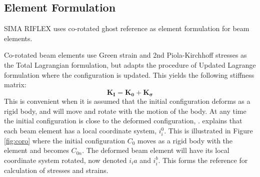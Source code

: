 \subsection{Element Formulation}
\label{sec:ghost}
SIMA RIFLEX uses co-rotated ghost reference as element formulation for beam elements. 

Co-rotated beam elements use Green strain and 2nd
Piola-Kirchhoff stresses as the Total Lagrangian formulation, but adapts the procedure of Updated Lagrange formulation where the configuration is updated. This yields the following stiffness matrix:
\begin{equation}
    \boldsymbol{K_I}= \boldsymbol{K_0} + \boldsymbol{K_\sigma}
\end{equation}
This is convenient when it is assumed that the initial configuration deforms as a rigid body, and will move and rotate with the motion of the body. At any time the initial configuration is close to the deformed configuration, \cite{sintef2017}. \cite{Mathisen1990} explains that each beam element has a local coordinate system, $i_i^0$. This is illustrated in Figure \ref{fig:coro} where the initial configuration $C_0$ moves as a rigid body with the element and becomes $C_{0n}$. The deformed beam element will have its local coordinate system rotated, now denoted $i_ia$ and $i_i^b$. This forms the reference for calculation of stresses and strains. 

